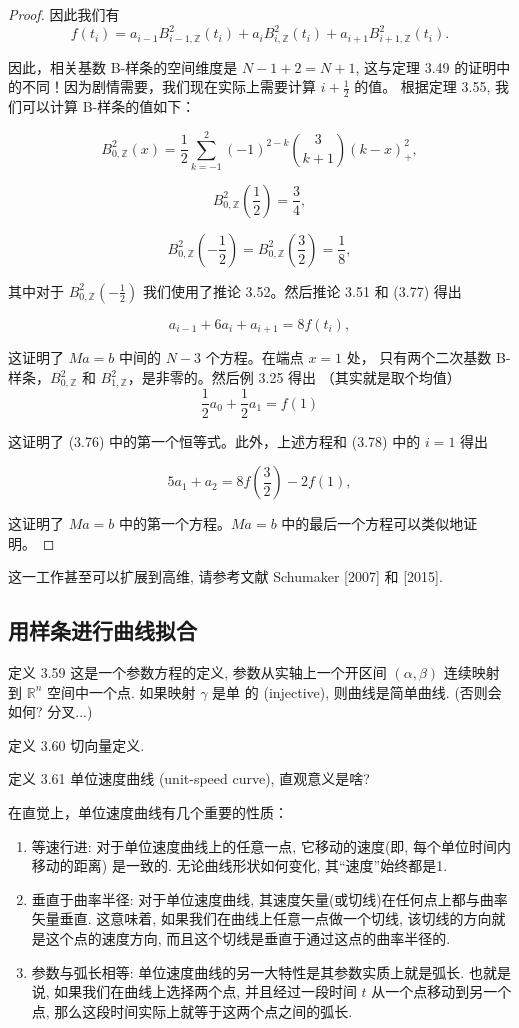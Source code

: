 \documentclass[a4paper]{ctexart}
\begin{document}
{\begin{proof}
因此我们有
\[ 
f(t_i) = a_{i-1} B_{i-1, \mathbb{Z}}^2(t_i) + a_i B_{i, \mathbb{Z}}^2(t_i) + a_{i+1} B_{i+1, \mathbb{Z}}^2(t_i). \tag{3.77}
\]
  
因此，相关基数 B-样条的空间维度是 $N - 1 + 2 = N + 1$, 这与定理 3.49 的证明中的不同！因为剧情需要，我们现在实际上需要计算 $i + \frac{1}{2}$ 的值。
根据定理 3.55, 我们可以计算 B-样条的值如下：
  
$$ B_{0, \mathbb{Z}}^2(x) = \frac{1}{2} \sum_{k=-1}^{2} (-1)^{2-k} \binom{3}{k+1} (k-x)_+^2, $$
  
$$ B_{0, \mathbb{Z}}^2\left(\frac{1}{2}\right) = \frac{3}{4}, $$
  
$$ B_{0, \mathbb{Z}}^2\left(-\frac{1}{2}\right) = B_{0, \mathbb{Z}}^2\left(\frac{3}{2}\right) = \frac{1}{8}, $$
  
其中对于 $B_{0, \mathbb{Z}}^2\left(-\frac{1}{2}\right)$ 我们使用了推论 3.52。然后推论 3.51 和 (3.77) 得出
  
\[ 
a_{i-1} + 6a_i + a_{i+1} = 8f(t_i), \tag{3.78}
\]
  
这证明了 $Ma = b$ 中间的 $N-3$ 个方程。在端点 $x = 1$ 处，
只有两个二次基数 B-样条，$B_{0, \mathbb{Z}}^2$ 和 $B_{1, \mathbb{Z}}^2$，是非零的。然后例 3.25 得出
（其实就是取个均值）  
\[ 
\frac{1}{2}a_0 + \frac{1}{2}a_1 = f(1) 
\]
  
这证明了 (3.76) 中的第一个恒等式。此外，上述方程和 (3.78) 中的 $i = 1$ 得出
  
\[ 
5a_1 + a_2 = 8f\left(\frac{3}{2}\right) - 2f(1), 
\]
  
这证明了 $Ma = b$ 中的第一个方程。$Ma = b$ 中的最后一个方程可以类似地证明。

\end{proof}
这一工作甚至可以扩展到高维, 请参考文献 Schumaker [2007] 和 [2015].

\subsection{用样条进行曲线拟合}

定义 3.59 这是一个参数方程的定义, 参数从实轴上一个开区间 $(\alpha,
\beta)$ 连续映射到 $\mathbb{R}^n$ 空间中一个点. 如果映射 $\gamma$ 是单
的 (injective), 则曲线是简单曲线. (否则会如何? 分叉...)

定义 3.60 切向量定义.

定义 3.61 单位速度曲线 (unit-speed curve), 直观意义是啥? 

在直觉上，单位速度曲线有几个重要的性质：

\begin{enumerate}
  \item 等速行进: 对于单位速度曲线上的任意一点, 它移动的速度(即, 每个单位时间内移动的距离) 是一致的. 无论曲线形状如何变化, 其“速度”始终都是1.
  \item 垂直于曲率半径: 对于单位速度曲线, 其速度矢量(或切线)在任何点上都与曲率矢量垂直. 这意味着, 
  如果我们在曲线上任意一点做一个切线, 该切线的方向就是这个点的速度方向, 而且这个切线是垂直于通过这点的曲率半径的.
  \item 参数与弧长相等: 单位速度曲线的另一大特性是其参数实质上就是弧长. 也就是说, 如果我们在曲线上选择两个点, 
  并且经过一段时间 $t$ 从一个点移动到另一个点, 那么这段时间实际上就等于这两个点之间的弧长.
\end{enumerate}

}
\end{document}
